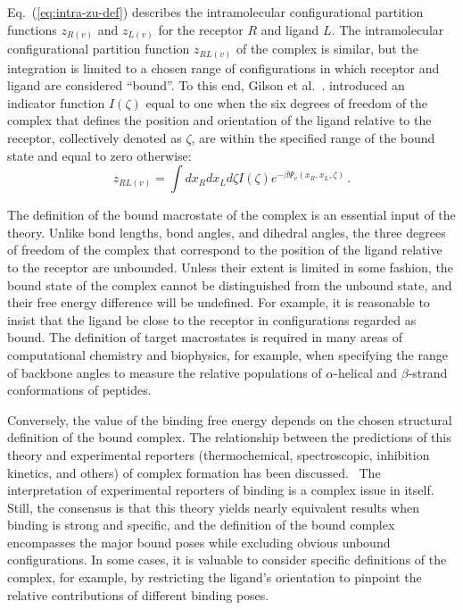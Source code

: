 \documentclass[9pt,bestpractices]{livecoms}
\begin{document}
Eq.~(\ref{eq:intra-zu-def}) describes the intramolecular configurational partition functions $z_{R(v)}$ and $z_{L(v)}$ for the receptor $R$ and ligand $L$. The intramolecular configurational partition function $z_{RL(v)}$ of the complex is similar, but the integration is limited to a chosen range of configurations in which receptor and ligand are considered ``bound''. To this end, Gilson et al.~\cite{gilson1997statisticalthermodynamic}. introduced an indicator function $I(\zeta)$ equal to one when the six degrees of freedom of the complex that defines the position and orientation of the ligand relative to the receptor, collectively denoted as $\zeta$, are within the specified range of the bound state and equal to zero otherwise:
\begin{equation}
  z_{RL(v)} = \int dx_R dx_L d\zeta I(\zeta) e^{-\beta \Psi_v(x_R, x_L, \zeta)} \, .
  \label{eq:intra-zRL-def}
\end{equation}

The definition of the bound macrostate of the complex is an essential input of the theory. Unlike bond lengths, bond angles, and dihedral angles, the three degrees of freedom of the complex that correspond to the position of the ligand relative to the receptor are unbounded. Unless their extent is limited in some fashion, the bound state of the complex cannot be distinguished from the unbound state, and their free energy difference will be undefined. For example, it is reasonable to insist that the ligand be close to the receptor in configurations regarded as bound. The definition of target macrostates is required in many areas of computational chemistry and biophysics, for example, when specifying the range of backbone angles to measure the relative populations of $\alpha$-helical and $\beta$-strand conformations of peptides.  

Conversely, the value of the binding free energy depends on the chosen structural definition of the bound complex. The relationship between the predictions of this theory and experimental reporters (thermochemical, spectroscopic, inhibition kinetics, and others) of complex formation has been discussed.~\cite{gilson1997statisticalthermodynamic,mihailescu2004theory,gallicchio2011recent,simonson2016physical,gallicchio2021comppeptsci} The interpretation of experimental reporters of binding is a complex issue in itself. Still, the consensus is that this theory yields nearly equivalent results when binding is strong and specific, and the definition of the bound complex encompasses the major bound poses while excluding obvious unbound configurations. In some cases, it is valuable to consider specific definitions of the complex, for example, by restricting the ligand's orientation to pinpoint the relative contributions of different binding poses.
\end{document}
